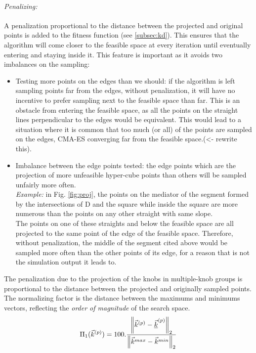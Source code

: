 \\
\emph{Penalizing:}\\
\\
A penalization proportional to the distance between the projected and original points is added to the fitness function (see \ref{subsec:kd}). This ensures that the algorithm will come closer to the feasible space at every iteration until eventually entering and staying inside it. This feature is important as it avoids two imbalances on the sampling:
\begin{itemize}
	\item Testing more points on the edges than we should: if the algorithm is left sampling points far from the edges, without penalization, it will have no incentive to prefer sampling next to the feasible space than far. This is an obstacle from entering the feasible space, as all the points on the straight lines perpendicular to the edges would be equivalent. This would lead to a situation where it is common that too much (or all) of the points are sampled on the edges, CMA-ES converging far from the feasible space.\color{red}(<- rewrite this)\color{black}.
	\item Imbalance between the edge points tested: the edge points which are the projection of more unfeasible hyper-cube points than others will be sampled unfairly more often.\\
	\emph{Example:} in Fig. \ref{fig:proj}, the points on the mediator of the segment formed by the intersections of D and the square while inside the square are more numerous than the points on any other straight with same slope.\\
The points on one of these straights and below the feasible space are all projected to the same point of the edge of the feasible space. Therefore, without penalization, the middle of the segment cited above would be sampled more often than the other points of its edge, for a reason that is not the simulation output it leads to. 
\end{itemize}

The penalization due to the projection of the knobs in multiple-knob groups is proportional to the distance between the projected and originally sampled points.
The normalizing factor is the distance between the maximums and minimums vectors, reflecting the \emph{order of magnitude} of the search space.
\begin{equation*}
	\Pi_{1}(\vec{k}^{(p)})=100.\frac{\left\lVert\vec{k}^{(p)}-\underline{\vec{k}}^{(p)}\right\rVert_{2}}{\left\lVert\vec{k}^{max}-\vec{k}^{min}\right\rVert_{2}}
\end{equation*}




